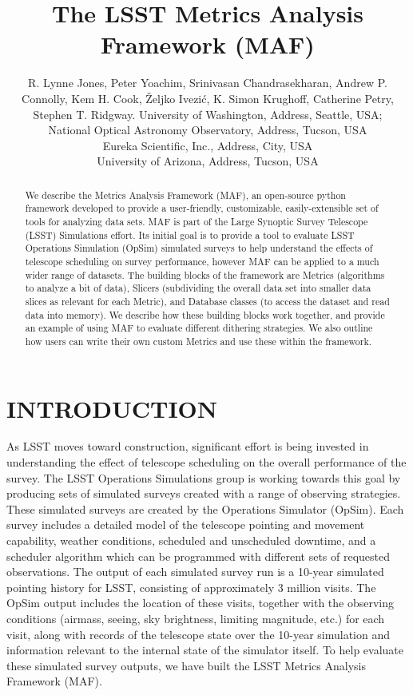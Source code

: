 \documentclass[]{spie}  %
\title{The LSST Metrics Analysis Framework (MAF)}
\author{R. Lynne Jones\supit{a}, Peter Yoachim\supit{a}, Srinivasan
  Chandrasekharan\supit{b}, Andrew P. Connolly\supit{a}, Kem
  H. Cook\supit{c}, {\v Z}eljko Ivezi{\'c}\supit{a},  K. Simon Krughoff\supit{a}, Catherine Petry\supit{d}, Stephen T. Ridgway\supit{b}.
\skiplinehalf
\supit{a}University of Washington, Address, Seattle, USA; \\
\supit{b}National Optical Astronomy Observatory, Address, Tucson, USA\\
\supit{c}Eureka Scientific, Inc., Address, City, USA\\
\supit{d}University of Arizona, Address, Tucson, USA\\
}
\begin{document}
 

  \maketitle 

\lstset{
language=Python,
showstringspaces=false,
formfeed=newpage,
tabsize=4,
basicstyle=\ttfamily\scriptsize,
commentstyle=\itshape,
breaklines=true
}


\begin{abstract}
We describe the Metrics Analysis Framework (MAF), an open-source
python framework developed to provide a user-friendly, customizable,
easily-extensible set of tools for analyzing data sets. MAF is part of
the Large Synoptic Survey Telescope (LSST) Simulations effort. Its
initial goal is to provide a tool to evaluate LSST Operations
Simulation (OpSim) simulated surveys to help understand the effects of
telescope scheduling on survey performance, however MAF can be applied
to a much wider range of datasets. The building blocks of the
framework are Metrics (algorithms to analyze a bit of data), Slicers
(subdividing the overall data set into smaller data slices as relevant
for each Metric), and Database classes (to access the dataset and read
data into memory). We describe how these building blocks work
together, and provide an example of using MAF to evaluate different
dithering strategies. We also outline how users can write their own
custom Metrics and use these within the framework. 
\end{abstract}


\section{INTRODUCTION}
\label{sec:intro}  

As LSST moves toward construction, significant effort is being
invested in understanding the effect of telescope scheduling on the
overall performance of the survey. The LSST Operations Simulations
group is working towards this goal by producing sets of simulated
surveys created with a range of observing strategies. These simulated
surveys are created by the Operations Simulator (OpSim)\cite{opsim3, opsim2, opsim1}. Each
survey includes a detailed model of the telescope pointing and
movement capability, weather conditions, scheduled and unscheduled
downtime, and a scheduler algorithm which can be programmed with
different sets of requested observations. The output of each simulated
survey run is a 10-year simulated pointing history for LSST,
consisting of approximately 3 million visits. The OpSim output
includes the location of these visits, together
with the observing conditions (airmass, seeing, sky brightness,
limiting magnitude, etc.) for each visit, along with records of the
telescope state over the 10-year simulation and information relevant
to the internal state of the simulator itself. To help evaluate these
simulated survey outputs, we have built the LSST Metrics Analysis
Framework (MAF). 
\end{document}
